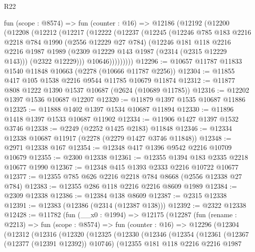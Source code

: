 \begin{lexlean}{R22}
\begin{coremodule}
    fun (scope : @8574) =>
    fun (counter : @16) =>
    @12186
      (@12192
        (@12200
          (@12208
            (@12212
              (@12217
                (@12222
                  (@12237
                    (@12245
                      (@12246
                        @785
                        @183
                        @2216
                        @2218
                        @784
                        @1990
                        (@2556 @12229 @27 @784)
                        (@12246
                          @181
                          @118
                          @2216
                          @2216
                          @1987
                          @1989
                          (@2309 @12229 @143 @1987 (@2314 (@2315 @12229 @143)))
                          (@2322 @12229)))
                      @10646)))))))))
@12296 := @10657 @11787 @11833 @1540 @11848 @10663 (@2278 (@10666 @11787 @2256))
@12304 := @11855 @417 @105 @1538 @2216 @9544 @11785 @10679 @11874
@12312 := @11877 @808 @1222 @1390 @1537 @10687 (@2624 (@10689 @11785))
@12316 := @12202 @1397 @1536 @10687 @12207
@12320 := @11879 @1397 @1535 @10687 @11886
@12325 := @11888 @1402 @1397 @1534 @10687 @11894
@12330 := @11896 @1418 @1397 @1533 @10687 @11902
@12334 := @11906 @1427 @1397 @1532 @3746
@12338 := @2249 (@2252 @1425 @2183) @11848
@12346 := @12334 @12338 @10687 @11917 (@2278 (@2279 @1427 @3746 @11848))
@12348 := @2971 @12338 @167
@12354 := @12348 @417 @1396 @9542 @2216 @10709 @10679
@12355 := @2300 @12338
@12361 := @12355 @1394 @183 @2335 @2218 @10677 @1990
@12367 := @12348 @415 @1393 @2333 @2216 @10722 @10677
@12377 := @12355 @785 @626 @2216 @2218 @784 @8668 (@2556 @12338 @27 @784)
@12383 := @12355 @286 @118 @2216 @2216 @8609 @1989
@12384 := @2309 @12338
@12386 := @12384 @138 @8609
@12387 := @2315 @12338
@12391 := @12383 (@12386 (@2314 (@12387 @138)))
@12392 := @2322 @12338
@12428 := @11782
    (fun (__x0 : @1994) =>
    @12175
      (@12287
        (fun (rename : @2213) =>
        fun (scope : @8574) =>
        fun (counter : @16) =>
        @12296
          (@12304
            (@12312
              (@12316
                (@12320
                  (@12325
                    (@12330
                      (@12346
                        (@12354
                          (@12361
                            (@12367 (@12377 (@12391 @12392)) @10746)
                            (@12355
                              @181
                              @118
                              @2216
                              @2216
                              @1987

\end{coremodule}
\end{lexlean}
